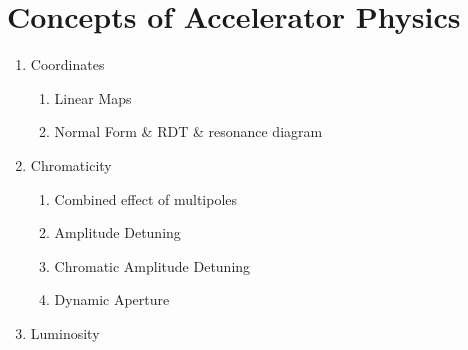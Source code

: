 \chapter{Concepts of Accelerator Physics}
\thumbforchapter{}
\chaptertoc{}
\newpage

\begin{enumerate}
    \tightlist
    \color{red}
    \item Coordinates
    \begin{enumerate}
    \tightlist
        \item Linear Maps
        \item Normal Form \& RDT \& resonance diagram
    \end{enumerate}
    \item Chromaticity
    \begin{enumerate}
    \tightlist
        \item Combined effect of multipoles
        \item Amplitude Detuning
        \item Chromatic Amplitude Detuning
        \item Dynamic Aperture
    \end{enumerate}
    \item Luminosity
\end{enumerate}








